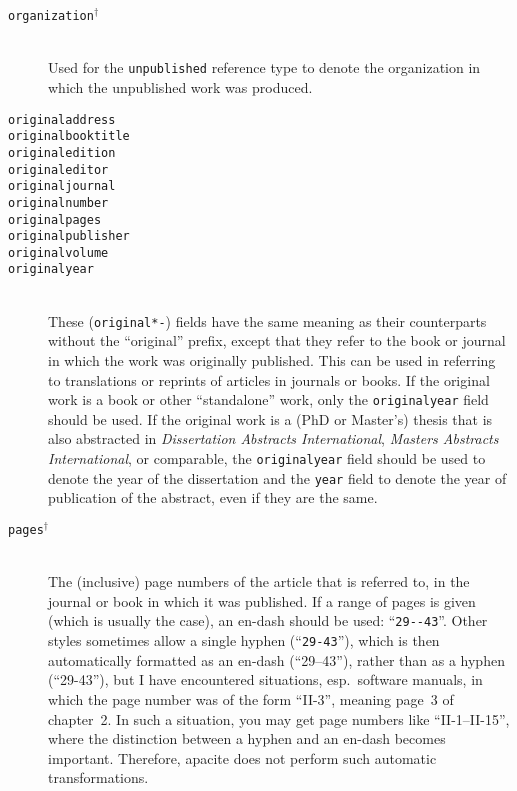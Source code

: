 \documentclass{article}
\newcommand{\LC}{\mbox{${}^{\dag}$}}%
\newcommand{\pkg}[1]{\textsf{#1}}%
\newcommand{\fieldname}[1]{\texttt{#1}}%
\newcommand{\entryname}[1]{\texttt{#1}}%
\begin{document}
\begin{description}
    \item[\fieldname{organization}\LC] \mbox{}\\
       Used for the \entryname{unpublished} reference type to denote
       the organization in which the unpublished work was produced.

    \item[\fieldname{originaladdress}]
    \item[\fieldname{originalbooktitle}]
    \item[\fieldname{originaledition}]
    \item[\fieldname{originaleditor}]
    \item[\fieldname{originaljournal}]
    \item[\fieldname{originalnumber}]
    \item[\fieldname{originalpages}]
    \item[\fieldname{originalpublisher}]
    \item[\fieldname{originalvolume}]
    \item[\fieldname{originalyear}] \mbox{}\\
        These (\fieldname{original*-}) fields have the same
        meaning as their counterparts without the ``original'' prefix,
        except that they refer to the book or journal in which the
        work was originally published. This can be used in referring to
        translations or reprints of articles in journals or books. If the
        original work is a book or other ``standalone'' work,
        only the \fieldname{originalyear} field should be used. If the
        original work is a (PhD or Master's) thesis that is also abstracted
        in \emph{Dissertation Abstracts International},
        \emph{Masters Abstracts International}, or comparable, the
        \fieldname{originalyear} field should be used to denote the year
        of the dissertation and the \fieldname{year} field to
        denote the year of publication of the abstract, even if they
        are the same.

    \item[\fieldname{pages}\LC] \mbox{}\\
        The (inclusive) page numbers of the article that is referred to,
        in the journal or book in which it was published. If a range of
        pages is given (which is usually the case), an  en-dash should
        be used: ``\verb+29--43+''. Other styles sometimes allow a
        single hyphen (``\verb+29-43+''), which is then automatically
        formatted as an en-dash (``29--43''), rather than as a hyphen
        (``29-43''), but I have encountered situations, esp.\ software
        manuals, in which the page number was of the form ``II-3'',
        meaning page~3 of chapter~2. In such a situation, you may
        get page numbers like ``II-1--II-15'', where the distinction
        between a hyphen and an en-dash becomes important. Therefore,
        \pkg{apacite} does not perform such automatic transformations.


\end{description}
\end{document}

